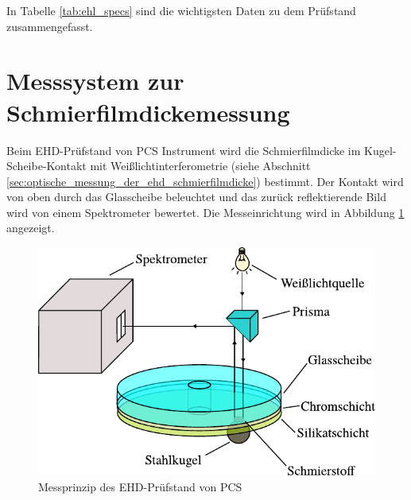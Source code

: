 In Tabelle \ref{tab:ehl_specs} sind die wichtigsten Daten zu dem Prüfstand zusammengefasst.


\section{Messsystem zur Schmierfilmdickemessung}
\label{sec:messsystem_zur_schmierfilmdickemessung}

Beim EHD-Prüfstand von PCS Instrument wird die Schmierfilmdicke im Kugel-Scheibe-Kontakt mit Weißlichtinterferometrie (siehe Abschnitt \ref{sec:optische_messung_der_ehd_schmierfilmdicke}) bestimmt.
Der Kontakt wird von oben durch das Glasscheibe beleuchtet und das zurück reflektierende Bild wird von einem Spektrometer bewertet.
Die Messeinrichtung wird in Abbildung \ref{fig:ehl_messprinzip} angezeigt.
\begin{figure}[htb]
    \centering
    \includegraphics[]{./images/ehd_messprinzip.pdf}
    \caption{Messprinzip des EHD-Prüfstand von PCS \cite{mach_2008}}
    \label{fig:ehl_messprinzip}
\end{figure}
%

